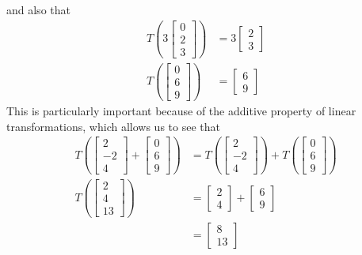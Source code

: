 \documentclass{report}
\begin{document}
and also that
$$
\begin{aligned}
	T\left(3\begin{bmatrix} 0 \\ 2 \\ 3 \end{bmatrix}\right) & = 3\begin{bmatrix} 2 \\ 3 \end{bmatrix} \\
	T\left(\begin{bmatrix} 0 \\ 6 \\ 9 \end{bmatrix}\right) & = \begin{bmatrix} 6 \\ 9 \end{bmatrix}
\end{aligned}
$$
This is particularly important because of the additive property of linear transformations, which allows us to see that
$$
\begin{aligned}
	T\left(\begin{bmatrix} 2 \\ -2 \\ 4 \end{bmatrix} + \begin{bmatrix} 0 \\ 6 \\ 9 \end{bmatrix}\right) & =
	T\left(\begin{bmatrix} 2 \\ -2 \\ 4 \end{bmatrix}\right) + T\left(\begin{bmatrix} 0 \\ 6 \\ 9\end{bmatrix}\right) \\
	T\left(\begin{bmatrix} 2 \\ 4 \\ 13 \end{bmatrix}\right) & = \begin{bmatrix} 2 \\ 4 \end{bmatrix} + \begin{bmatrix} 6 \\ 9 \end{bmatrix} \\
	& = \begin{bmatrix} 8 \\ 13 \end{bmatrix}
\end{aligned}
$$
\end{document}
